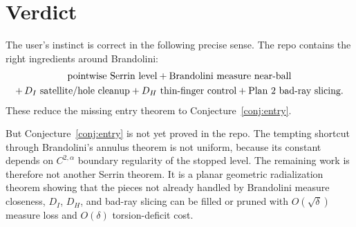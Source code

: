 \documentclass[11pt]{article}
\begin{document}
\section{Verdict}

The user's instinct is correct in the following precise sense.  The repo
contains the right ingredients around Brandolini:
\[
   \begin{gathered}
   \hbox{pointwise Serrin level}
   +\hbox{Brandolini measure near-ball}\\
   +\,D_I\hbox{ satellite/hole cleanup}
   +D_H\hbox{ thin-finger control}
   +\hbox{Plan 2 bad-ray slicing}.
   \end{gathered}
\]
These reduce the missing entry theorem to
Conjecture~\ref{conj:entry}.

But Conjecture~\ref{conj:entry} is not yet proved in the repo.  The tempting
shortcut through Brandolini's annulus theorem is not uniform, because its
constant depends on \(C^{2,\alpha}\) boundary regularity of the stopped level.
The remaining work is therefore not another Serrin theorem.  It is a planar
geometric radialization theorem showing that the pieces not already handled by
Brandolini measure closeness, \(D_I\), \(D_H\), and bad-ray slicing can be
filled or pruned with \(O(\sqrt\delta)\) measure loss and \(O(\delta)\)
torsion-deficit cost.
\end{document}

